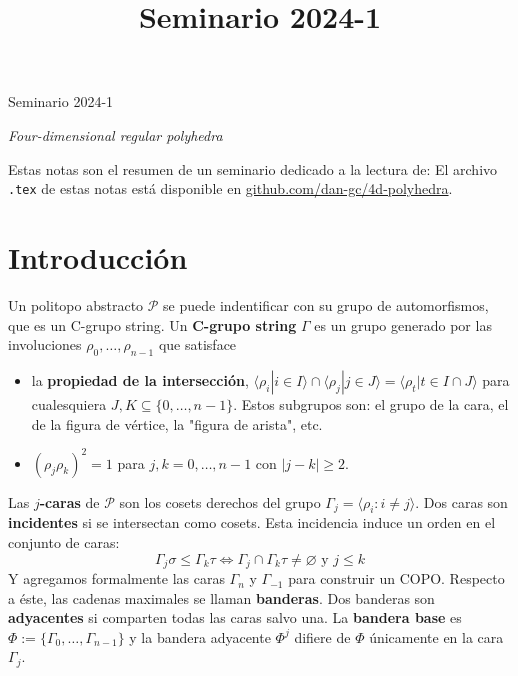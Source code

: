 \documentclass[spanish]{article}
\title{Seminario 2024-1}
\theoremstyle{definition}
\newcommand{\p}{\mathcal{P}}
\begin{document}
	\begin{center}
	{\LARGE Seminario 2024-1
		\vspace{.2cm}
		
		 \textit{Four-dimensional regular polyhedra}}
\end{center}
		\vspace{.2cm}
		
		Estas notas son el resumen de un seminario dedicado a la lectura de:
\printbibliography[heading=none]
		\vspace{.2cm}
El archivo \texttt{.tex} de estas notas está disponible en \href{https://github.com/dan-gc/4d-polyhedra}{github.com/dan-gc/4d-polyhedra}.

\tableofcontents


\section{Introducción}
Un politopo abstracto $\p$ se puede indentificar con su grupo de automorfismos, que es un C-grupo string.
Un \textbf{C-grupo string} $\Gamma$ es un grupo generado por las involuciones $\rho_0,\ldots,\rho_{n-1}$ que satisface
\begin{itemize}
	\item la \textbf{propiedad de la intersección},
	$\langle \rho_i|i\in I\rangle\cap\langle\rho_j|j\in J\rangle=\langle\rho_t|t\in I\cap J\rangle$ para cualesquiera $J,K\subseteq\{0,\ldots,n-1\}$. Estos subgrupos son: el grupo de la cara, el de la figura de vértice, la "figura de arista", etc.
	\item $(\rho_j\rho_k)^2=1$ para $j,k=0,\ldots,n-1$ con $|j-k|\geq2$.
\end{itemize}
Las $j$\textbf{-caras} de $\p$ son los cosets derechos del grupo $\Gamma_j=\langle \rho_i:i\neq j\rangle$. Dos caras son \textbf{incidentes} si se intersectan como cosets. Esta incidencia induce un orden en el conjunto de caras:
\[\Gamma_j\sigma\leq\Gamma_k\tau\iff\Gamma_j\cap\Gamma_k\tau\neq\varnothing\text{ y }j\leq k\]
Y agregamos formalmente las caras $\Gamma_n$ y $\Gamma_{-1}$ para construir un COPO. Respecto a éste, las cadenas maximales se llaman \textbf{banderas}. Dos banderas son \textbf{adyacentes} si comparten todas las caras salvo una. La \textbf{bandera base} es $\Phi:=\{\Gamma_0,\dots,\Gamma_{n-1}\}$ y la bandera adyacente $\Phi^j$ difiere de $\Phi$ únicamente en la cara $\Gamma_j$.
\end{document}
